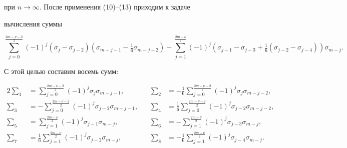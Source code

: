 \begin{pf}
при $n\to\infty$. После применения (10)--(13) приходим к задаче 


вычисления суммы 


$$ 


\sum^{\frac{2m-\nu-2}{2}}_{j=0}(-1)^j 


(\sigma_j-\sigma_{j-2})(\sigma_{m-j-1}-\tfrac{1}{6} 


\sigma_{m-j-2})+\sum^{\frac{2m-\nu}{2}}_{j=1}(-1)^j 


(\sigma_{j-1}-\sigma_{j-3}+\tfrac{1}{6} 


(\sigma_{j-2}-\sigma_{j-4}))\sigma_{m-j}. 


$$ 


С этой целью составим восемь сумм: 


\begin{alignat*}{2} 


\sum\nolimits_1&=\sum^{\frac{2m-\nu-2}{2}}_{j=0} 


(-1)^j\sigma_j\sigma_{m-j-1}, &\quad 


\sum\nolimits_2&=-\frac{1}{6}\sum^{\frac{2m-\nu-2}{2}}_{j=0} 


(-1)^j\sigma_j\sigma_{m-j-2}, \\ 


% 


\sum\nolimits_3&=-\sum^{\frac{2m-\nu-2}{2}}_{j=0} 


(-1)^j\sigma_{j-2}\sigma_{m-j-1}, &\quad 


\sum\nolimits_4&=\frac{1}{6}\sum^{\frac{2m-\nu-2}{2}}_{j=0} 


(-1)^j\sigma_{j-2}\sigma_{m-j-2},\\ 


% 


\sum\nolimits_5&=\sum^{\frac{2m-\nu}{2}}_{j=1} 


(-1)^j\sigma_{j-1}\sigma_{m-j}, &\quad 


\sum\nolimits_6&=-\sum^{\frac{2m-\nu}{2}}_{j=1} 


(-1)^j\sigma_{j-3}\sigma_{m-j},\\ 


% 


\sum\nolimits_7&=\frac{1}{6}\sum^{\frac{2m-\nu}{2}}_{j=1} 


(-1)^j\sigma_{j-2}\sigma_{m-j}, &\quad 


\sum\nolimits_8&=-\frac{1}{6}\sum^{\frac{2m-\nu}{2}}_{j=1} 


(-1)^j\sigma_{j-4}\sigma_{m-j}. 


\end{alignat*} 



\end{pf}
